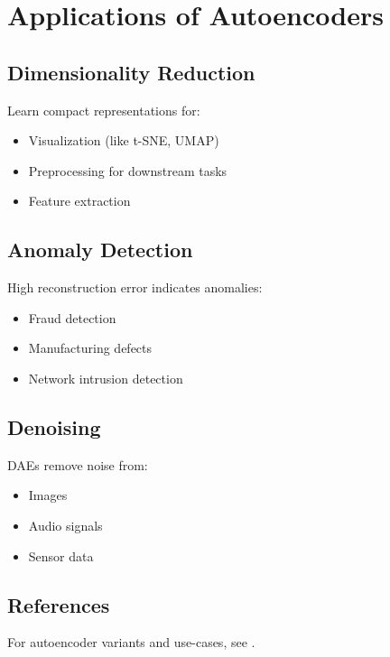 
\section{Applications of Autoencoders }
\label{sec:ae-applications}

\subsection{Dimensionality Reduction}

Learn compact representations for:
\begin{itemize}
    \item Visualization (like t-SNE, UMAP)
    \item Preprocessing for downstream tasks
    \item Feature extraction
\end{itemize}

\subsection{Anomaly Detection}

High reconstruction error indicates anomalies:
\begin{itemize}
    \item Fraud detection
    \item Manufacturing defects
    \item Network intrusion detection
\end{itemize}

\subsection{Denoising}

DAEs remove noise from:
\begin{itemize}
    \item Images
    \item Audio signals
    \item Sensor data
\end{itemize}




\subsection{References}

For autoencoder variants and use-cases, see \textcite{GoodfellowEtAl2016,Prince2023}.
